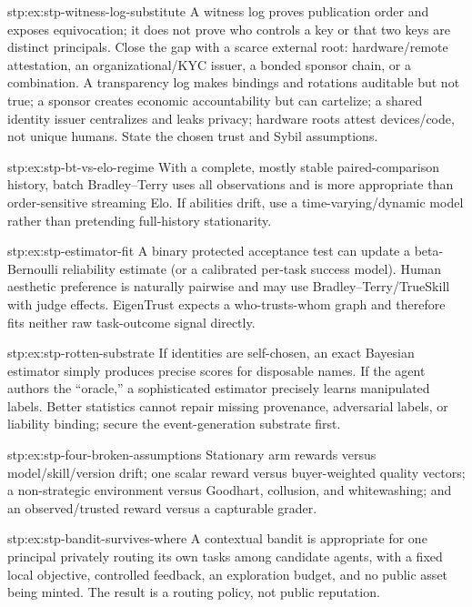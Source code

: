 \begin{pdSolution}{stp:ex:stp-witness-log-substitute}
A witness log proves publication order and exposes equivocation; it does not
prove who controls a key or that two keys are distinct principals. Close the
gap with a scarce external root: hardware/remote attestation, an
organizational/KYC issuer, a bonded sponsor chain, or a combination. A
transparency log makes bindings and rotations auditable but not true; a
sponsor creates economic accountability but can cartelize; a shared identity
issuer centralizes and leaks privacy; hardware roots attest devices/code, not
unique humans. State the chosen trust and Sybil assumptions.
\end{pdSolution}
\begin{pdSolution}{stp:ex:stp-bt-vs-elo-regime}
With a complete, mostly stable paired-comparison history, batch
Bradley--Terry uses all observations and is more appropriate than
order-sensitive streaming Elo. If abilities drift, use a time-varying/dynamic
model rather than pretending full-history stationarity.
\end{pdSolution}
\begin{pdSolution}{stp:ex:stp-estimator-fit}
A binary protected acceptance test can update a beta-Bernoulli reliability
estimate (or a calibrated per-task success model). Human aesthetic preference
is naturally pairwise and may use Bradley--Terry/TrueSkill with judge
effects. EigenTrust expects a who-trusts-whom graph and therefore fits
neither raw task-outcome signal directly.
\end{pdSolution}
\begin{pdSolution}{stp:ex:stp-rotten-substrate}
If identities are self-chosen, an exact Bayesian estimator simply produces
precise scores for disposable names. If the agent authors the ``oracle,'' a
sophisticated estimator precisely learns manipulated labels. Better
statistics cannot repair missing provenance, adversarial labels, or
liability binding; secure the event-generation substrate first.
\end{pdSolution}
\begin{pdSolution}{stp:ex:stp-four-broken-assumptions}
Stationary arm rewards versus model/skill/version drift; one scalar reward
versus buyer-weighted quality vectors; a non-strategic environment versus
Goodhart, collusion, and whitewashing; and an observed/trusted reward versus
a capturable grader.
\end{pdSolution}
\begin{pdSolution}{stp:ex:stp-bandit-survives-where}
A contextual bandit is appropriate for one principal privately routing its
own tasks among candidate agents, with a fixed local objective, controlled
feedback, an exploration budget, and no public asset being minted. The
result is a routing policy, not public reputation.
\end{pdSolution}
